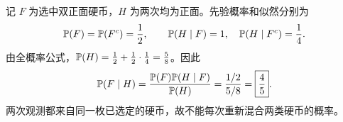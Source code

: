 记 $F$ 为选中双正面硬币，$H$ 为两次均为正面。先验概率和似然分别为
\[
\mathbb{P}(F)=\mathbb{P}(F^c)=\frac12,\qquad
\mathbb{P}(H\mid F)=1,\quad \mathbb{P}(H\mid F^c)=\frac14.
\]
由全概率公式，$\mathbb{P}(H)=\frac12+\frac12\cdot\frac14=\frac58$。因此
\[
\mathbb{P}(F\mid H)=\frac{\mathbb{P}(F)\mathbb{P}(H\mid F)}{\mathbb{P}(H)}
=\frac{1/2}{5/8}=\boxed{\frac45}.
\]
两次观测都来自同一枚已选定的硬币，故不能每次重新混合两类硬币的概率。
